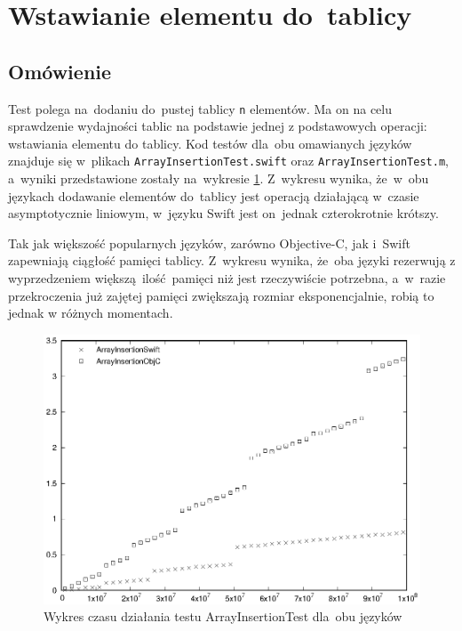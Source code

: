 \documentclass[mgr, shortabstract]{iithesis}
\newcommand{\swiftinline}[1]{
    \texttt{#1}
}
\begin{document}
\section{Wstawianie elementu do~tablicy}

\subsection{Omówienie}

Test polega na~dodaniu do~pustej tablicy \swiftinline{n} elementów. Ma on na celu sprawdzenie wydajności tablic na podstawie jednej z podstawowych operacji: wstawiania elementu do tablicy. Kod testów dla~obu omawianych języków znajduje się w~plikach \texttt{ArrayInsertionTest.swift} oraz \texttt{ArrayInsertionTest.m}, a~wyniki przedstawione zostały na~wykresie \ref{p:array_insertion}. Z~wykresu wynika, że~w~obu językach dodawanie elementów do~tablicy jest operacją działającą w~czasie asymptotycznie liniowym, w~języku Swift jest on~jednak czterokrotnie krótszy.

Tak jak większość popularnych języków, zarówno Objective-C, jak i~Swift zapewniają ciągłość pamięci tablicy. Z~wykresu wynika, że~oba języki rezerwują z wyprzedzeniem większą ilość pamięci niż jest rzeczywiście potrzebna, a~w~razie przekroczenia już zajętej pamięci zwiększają rozmiar eksponencjalnie, robią to jednak w różnych momentach.

\begin{figure}[ht]
    \includegraphics{plots/ArrayInsertion.eps}
    \caption{Wykres czasu działania testu ArrayInsertionTest dla~obu języków}
    \label{p:array_insertion}
\end{figure}
\end{document}
